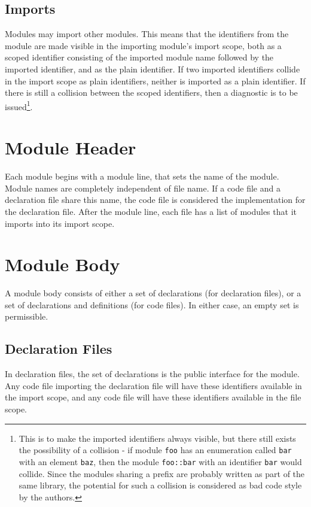 \documentclass[letterpaper,12pt]{book}
\begin{document}
\subsection{Imports}

Modules may import other modules. This means that the identifiers from the module are made visible in the importing module's import scope, both as a scoped identifier consisting of the imported module name followed by the imported identifier, and as the plain identifier. If two imported identifiers collide in the import scope as plain identifiers, neither is imported as a plain identifier. If there is still a collision between the scoped identifiers, then a diagnostic is to be issued\footnote{This is to make the imported identifiers always visible, but there still exists the possibility of a collision - if module \texttt{foo} has an enumeration called \texttt{bar} with an element \texttt{baz}, then the module \texttt{foo::bar} with an identifier \texttt{bar} would collide. Since the modules sharing a prefix are probably written as part of the same library, the potential for such a collision is considered as bad code style by the authors.}.

\section{Module Header}

Each module begins with a module line, that sets the name of the module. Module names are completely independent of file name. If a code file and a declaration file share this name, the code file is considered the implementation for the declaration file. After the module line, each file has a list of modules that it imports into its import scope.

\section{Module Body}

A module body consists of either a set of declarations (for declaration files), or a set of declarations and definitions (for code files). In either case, an empty set is permissible.

\subsection{Declaration Files}

In declaration files, the set of declarations is the public interface for the module. Any code file importing the declaration file will have these identifiers available in the import scope, and any code file will have these identifiers available in the file scope.
\end{document}
